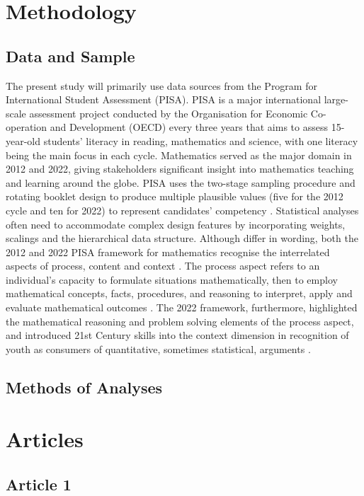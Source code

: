 \documentclass[
    a4paper,                %
    11pt,                   %
    stu,                    %
    donotrepeattitle,       %
    floatsintext,           %
    biblatex,               %
    colorlinks=true,        %
    linkcolor=red,          %
    anchorcolor=black,      %
    citecolor=blue,         %
    urlcolor=blue,          %
    bookmarks=true,         %
    bookmarksopen=false,    %
    bookmarksnumbered=true, %
    dvipsnames              %
]{apa7}
\begin{document}
\section{Methodology}

\subsection{Data and Sample}

The present study will primarily use data sources from the Program for International Student Assessment (PISA). PISA is a major international large-scale assessment project conducted by the Organisation for Economic Co-operation and Development (OECD) every three years that aims to assess 15-year-old students' literacy in reading, mathematics and science, with one literacy being the main focus in each cycle. Mathematics served as the major domain in 2012 and 2022, giving stakeholders significant insight into mathematics teaching and learning around the globe. PISA uses the two-stage sampling procedure and rotating booklet design to produce multiple plausible values (five for the 2012 cycle and ten for 2022) to represent candidates' competency \parencite{rust:2014}. Statistical analyses often need to accommodate complex design features by incorporating weights, scalings and the hierarchical data structure. Although differ in wording, both the 2012 and 2022 PISA framework for mathematics recognise the interrelated aspects of process, content and context \parencite{oecd:2013}. The process aspect refers to an individual's capacity to formulate situations mathematically, then to employ mathematical concepts, facts, procedures, and reasoning to interpret, apply and evaluate mathematical outcomes \parencite[][p. 28]{oecd:2013}. The 2022 framework, furthermore, highlighted the mathematical reasoning and problem solving elements of the process aspect, and introduced 21st Century skills into the context dimension in recognition of youth as consumers of quantitative, sometimes statistical, arguments \parencite{oecd:2018}.

\subsection{Methods of Analyses}

\section{Articles}

\subsection{Article 1}
\end{document}
